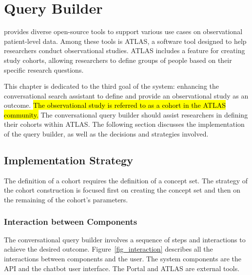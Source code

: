 \chapter{Query Builder}
\label{chapter:QB}

{\ohdsi} provides diverse open-source tools to support various use cases on observational patient-level data. Among these tools is ATLAS, a software tool designed to help researchers conduct observational studies. ATLAS includes a feature for creating study cohorts, allowing researchers to define groups of people based on their specific research questions.

This chapter is dedicated to the third goal of the system: enhancing the conversational search assistant to define and provide an observational study as an outcome. \hl{The observational study is referred to as a cohort in the ATLAS community.} The conversational query builder should assist researchers in defining their cohorts within ATLAS. The following section discusses the implementation of the query builder, as well as the decisions and strategies involved.


\section{Implementation Strategy}


The definition of a cohort requires the definition of a concept set. The strategy of the cohort construction is focused first on creating the concept set and then on the remaining of the cohort's parameters.


\subsection{Interaction between Components}

The conversational query builder involves a sequence of steps and interactions to achieve the desired outcome. Figure~\ref{fig_interaction} describes all the interactions between components and the user. The system components are the {\ir} API and the chatbot user interface. The {\ehden} Portal and ATLAS are external tools.

